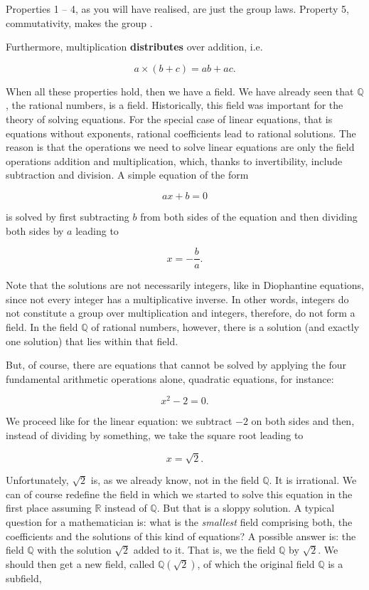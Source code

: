 \documentclass[tikz]{scrreprt}
\begin{document}
Properties 1 -- 4, as you will have realised, are just the group laws.
Property 5, commutativity, makes the group .

Furthermore, multiplication \textbf{distributes} over addition, i.e.

\[
a \times (b + c) = ab + ac.
\]

When all these properties hold, then we have a field.
We have already seen that $\mathbb{Q}$, the rational numbers,
is a field. Historically, this field was important for
the theory of solving equations. For the special case of
linear equations, that is equations without exponents,
rational coefficients lead to rational solutions. The reason is
that the operations we need to solve linear equations are
only the field operations addition and multiplication, which,
thanks to invertibility, include subtraction and division.
A simple equation of the form

\begin{equation}
ax + b = 0
\end{equation}

is solved by first subtracting $b$ from both sides of the equation
and then dividing both sides by $a$ leading to

\begin{equation}
x = -\frac{b}{a}.
\end{equation}

Note that the solutions are not necessarily integers,
like in Diophantine equations, since not every integer
has a multiplicative inverse. In other words, integers
do not constitute a group over multiplication and integers,
therefore, do not form a field.
In the field $\mathbb{Q}$ of rational numbers, however,
there is a solution (and exactly one solution) that lies
within that field.

But, of course, there are equations that cannot be solved
by applying the four fundamental arithmetic operations alone,
quadratic equations, for instance:

\begin{equation}
x^2 - 2 = 0.
\end{equation}

We proceed like for the linear equation: we subtract
$-2$ on both sides and then, instead of dividing by something,
we take the square root leading to

\begin{equation}
x = \sqrt{2}.
\end{equation}

Unfortunately, $\sqrt{2}$ is, as we already know,
not in the field $\mathbb{Q}$. It is irrational.
We can of course redefine the field 
in which we started to solve this equation in the first place
assuming $\mathbb{R}$ instead of $\mathbb{Q}$.
But that is a sloppy solution.
A typical question for a mathematician is:
what is the \emph{smallest} field comprising both,
the coefficients and the solutions of this kind of equations?
A possible answer is: the field $\mathbb{Q}$ with the solution
$\sqrt{2}$ added to it. 
That is, we  the field $\mathbb{Q}$
by  $\sqrt{2}$.
We should then get a new field, called $\mathbb{Q}(\sqrt{2})$,
of which the original field $\mathbb{Q}$ is a subfield,
\ie\
\end{document}
